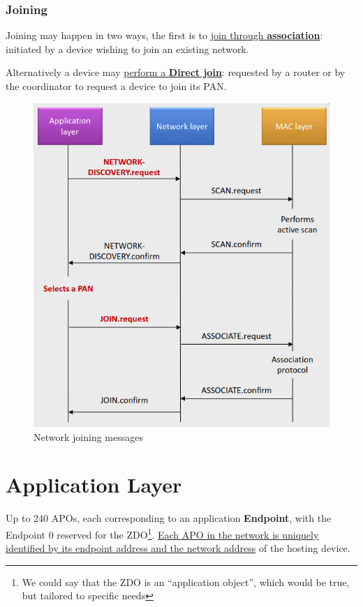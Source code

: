 \subsubsection{Joining}
\begin{paracol}{2}
   \colfill
   Joining may happen in two ways, the first is to \ul{join through \textbf{association}}: 
   initiated by a device wishing to join an existing network.
   
   Alternatively a device may \ul{perform a 
\textbf{Direct join}}:
   requested by a router or by the coordinator to request a device to join its PAN.
   \colfill
   \switchcolumn
   \begin{figure}[htbp]
      \centering
      \includegraphics{images/zigbee_netjoining.png}
      \caption{Network joining messages}
      \label{fig:zigbee_netjoining}
   \end{figure}
\end{paracol}

\section{Application Layer}

Up to 240 APOs, each corresponding to an application \textbf{Endpoint}, with the Endpoint 0 reserved for the ZDO\footnote{We could say that the ZDO is an ``application object'', which would be true, but tailored to specific needs}.
\ul{Each APO in the network is uniquely identified by its endpoint address and the network address} of the hosting device.

